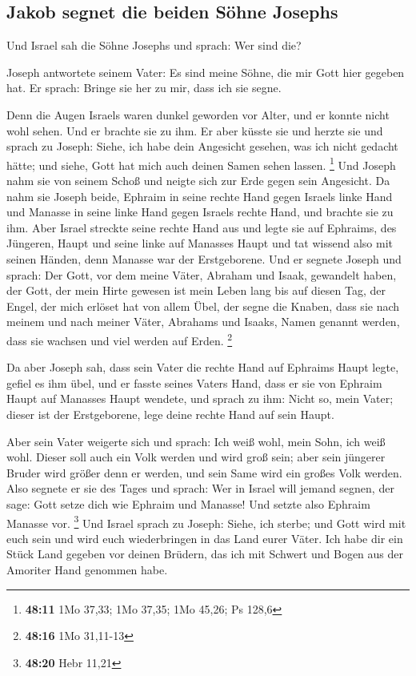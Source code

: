 \hypertarget{jakob-segnet-die-beiden-suxf6hne-josephs}{%
\subsection{Jakob segnet die beiden Söhne
Josephs}\label{jakob-segnet-die-beiden-suxf6hne-josephs}}

 Und Israel sah die Söhne Josephs und sprach: Wer sind
die?

 Joseph antwortete seinem Vater: Es sind meine Söhne, die
mir Gott hier gegeben hat. Er sprach: Bringe sie her zu mir, dass ich
sie segne.

 Denn die Augen Israels waren dunkel geworden vor Alter,
und er konnte nicht wohl sehen. Und er brachte sie zu ihm. Er aber
küsste sie und herzte sie  und sprach zu Joseph: Siehe,
ich habe dein Angesicht gesehen, was ich nicht gedacht hätte; und siehe,
Gott hat mich auch deinen Samen sehen lassen. \footnote{\textbf{48:11}
  1Mo 37,33; 1Mo 37,35; 1Mo 45,26; Ps 128,6}  Und Joseph
nahm sie von seinem Schoß und neigte sich zur Erde gegen sein Angesicht.
 Da nahm sie Joseph beide, Ephraim in seine rechte Hand
gegen Israels linke Hand und Manasse in seine linke Hand gegen Israels
rechte Hand, und brachte sie zu ihm.  Aber Israel
streckte seine rechte Hand aus und legte sie auf Ephraims, des Jüngeren,
Haupt und seine linke auf Manasses Haupt und tat wissend also mit seinen
Händen, denn Manasse war der Erstgeborene.  Und er
segnete Joseph und sprach: Der Gott, vor dem meine Väter, Abraham und
Isaak, gewandelt haben, der Gott, der mein Hirte gewesen ist mein Leben
lang bis auf diesen Tag,  der Engel, der mich erlöset hat
von allem Übel, der segne die Knaben, dass sie nach meinem und nach
meiner Väter, Abrahams und Isaaks, Namen genannt werden, dass sie
wachsen und viel werden auf Erden. \footnote{\textbf{48:16} 1Mo 31,11-13}

 Da aber Joseph sah, dass sein Vater die rechte Hand auf
Ephraims Haupt legte, gefiel es ihm übel, und er fasste seines Vaters
Hand, dass er sie von Ephraim Haupt auf Manasses Haupt wendete,
 und sprach zu ihm: Nicht so, mein Vater; dieser ist der
Erstgeborene, lege deine rechte Hand auf sein Haupt.

 Aber sein Vater weigerte sich und sprach: Ich weiß wohl,
mein Sohn, ich weiß wohl. Dieser soll auch ein Volk werden und wird groß
sein; aber sein jüngerer Bruder wird größer denn er werden, und sein
Same wird ein großes Volk werden.  Also segnete er sie
des Tages und sprach: Wer in Israel will jemand segnen, der sage: Gott
setze dich wie Ephraim und Manasse! Und setzte also Ephraim Manasse vor.
\footnote{\textbf{48:20} Hebr 11,21}  Und Israel sprach
zu Joseph: Siehe, ich sterbe; und Gott wird mit euch sein und wird euch
wiederbringen in das Land eurer Väter.  Ich habe dir ein
Stück Land gegeben vor deinen Brüdern, das ich mit Schwert und Bogen aus
der Amoriter Hand genommen habe.

